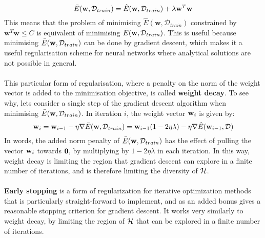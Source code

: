 $$
\bar{E}(\mathbf{w}, \mathcal{D}_{train}) = \hat{E}(\mathbf{w}, \mathcal{D}_{train}) + \lambda\mathbf{w}^T\mathbf{w}
$$
This means that the problem of minimising $\hat{E}(\mathbf{w}, \mathcal{D}_{train})$ constrained by $\mathbf{w}^T\mathbf{w} \leq C$ is equivalent of minimising $\bar{E}(\mathbf{w}, \mathcal{D}_{train})$. This is useful because minimising $\bar{E}(\mathbf{w}, \mathcal{D}_{train})$ can be done by gradient descent, which makes it a useful regularisation scheme for neural networks where analytical solutions are not possible in general.
\\\\
This particular form of regularisation, where a penalty on the norm of the weight vector is added to the minimisation objective, is called \textbf{weight decay}. To see why, lets consider a single step of the gradient descent algorithm when minimising $\bar{E}(\mathbf{w}, \mathcal{D}_{train})$. In iteration $i$, the weight vector $\mathbf{w}_i$ is given by:
$$
\mathbf{w}_i = \mathbf{w}_{i-1} - \eta \nabla \bar{E}(\mathbf{w}, \mathcal{D}_{train}) = \mathbf{w}_{i-1}(1 - 2\eta\lambda) - \eta \nabla \hat{E}(\mathbf{w}_{i-1}, \mathcal{D})	
$$
In words, the added norm penalty of $\bar{E}(\mathbf{w}, \mathcal{D}_{train})$ has the effect of pulling the vector $\mathbf{w}_i$ towards $\mathbf{0}$, by multiplying by $1 - 2\eta\lambda$ in each iteration. In this way, weight decay is limiting the region that gradient descent can explore in a finite number of iterations, and is therefore limiting the diversity of $\mathcal{H}$.
\\\\
\textbf{Early stopping} is a form of regularization for iterative optimization methods that is particularly straight-forward to implement, and as an added bonus gives a reasonable stopping criterion for gradient descent. It works very similarly to weight decay, by limiting the region of $\mathcal{H}$ that can be explored in a finite number of iterations.

